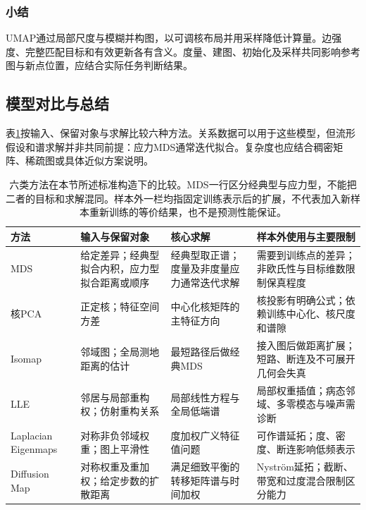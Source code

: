 \subsubsection{小结}

UMAP通过局部尺度与模糊并构图，以可调核布局并用采样降低计算量。边强度、完整匹配目标和有效更新各有含义。度量、建图、初始化及采样共同影响参考图与新点位置，应结合实际任务判断结果。

\subsection{模型对比与总结}
\label{sec:dim-manifold-comparison}
\label{sec:dim-neighbors-comparison}

表\ref{tab:dim-manifold-comparison}按输入、保留对象与求解比较六种方法。关系数据可以用于这些模型，但流形假设和谱求解并非共同前提：应力MDS通常迭代拟合。复杂度也应结合稠密矩阵、稀疏图或具体近似方案说明。

\begin{table}[htbp]
  \centering
  \small
  \begin{tabularx}{\linewidth}{@{}>{\RaggedRight\arraybackslash}p{22mm}>{\RaggedRight\arraybackslash}X>{\RaggedRight\arraybackslash}X>{\RaggedRight\arraybackslash}X@{}}
    \toprule
    方法 & 输入与保留对象 & 核心求解 & 样本外使用与主要限制 \\
    \midrule
    MDS & 给定差异；经典型拟合内积，应力型拟合距离或顺序
      & 经典型取正谱；度量及非度量应力通常迭代求解
      & 需要到训练点的差异；非欧氏性与目标维数限制保真程度 \\
    核PCA & 正定核；特征空间方差
      & 中心化核矩阵的主特征方向
      & 核投影有明确公式；依赖训练中心化、核尺度和谱隙 \\
    Isomap & 邻域图；全局测地距离的估计
      & 最短路径后做经典MDS
      & 接入图后做距离扩展；短路、断连及不可展开几何会失真 \\
    LLE & 邻居与局部重构权；仿射重构关系
      & 局部线性方程与全局低端谱
      & 局部权重插值；病态邻域、多零模态与噪声需诊断 \\
    Laplacian Eigenmaps & 对称非负邻域权重；图上平滑性
      & 度加权广义特征值问题
      & 可作谱延拓；度、密度、断连影响低频表示 \\
    Diffusion Map & 对称权重及重加权；给定步数的扩散距离
      & 满足细致平衡的转移矩阵谱与时间加权
      & Nystr\"om延拓；截断、带宽和过度混合限制区分能力 \\
    \bottomrule
  \end{tabularx}
  \caption{六类方法在本节所述标准构造下的比较。MDS一行区分经典型与应力型，不能把二者的目标和求解混同。样本外一栏均指固定训练表示后的扩展，不代表加入新样本重新训练的等价结果，也不是预测性能保证。}
  \label{tab:dim-manifold-comparison}
\end{table}

